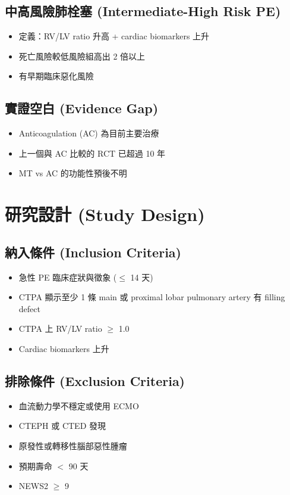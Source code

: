 \documentclass[11pt,a4paper]{article}
\begin{document}
\subsection{中高風險肺栓塞 (Intermediate-High Risk PE)}
\begin{itemize}[leftmargin=*,itemsep=2pt]
    \item 定義：RV/LV ratio 升高 + cardiac biomarkers 上升
    \item 死亡風險較低風險組高出 2 倍以上
    \item 有早期臨床惡化風險
\end{itemize}

\subsection{實證空白 (Evidence Gap)}
\begin{itemize}[leftmargin=*,itemsep=2pt]
    \item Anticoagulation (AC) 為目前主要治療
    \item 上一個與 AC 比較的 RCT 已超過 10 年
    \item MT vs AC 的功能性預後不明
\end{itemize}


\section{研究設計 (Study Design)}

\subsection{納入條件 (Inclusion Criteria)}
\begin{itemize}[leftmargin=*,itemsep=2pt]
    \item 急性 PE 臨床症狀與徵象 ($\leq$ 14 天)
    \item CTPA 顯示至少 1 條 main 或 proximal lobar pulmonary artery 有 filling defect
    \item CTPA 上 RV/LV ratio $\geq$ 1.0
    \item Cardiac biomarkers 上升
\end{itemize}

\subsection{排除條件 (Exclusion Criteria)}
\begin{itemize}[leftmargin=*,itemsep=2pt]
    \item 血流動力學不穩定或使用 ECMO
    \item CTEPH 或 CTED 發現
    \item 原發性或轉移性腦部惡性腫瘤
    \item 預期壽命 $<$ 90 天
    \item NEWS2 $\geq$ 9
\end{itemize}
\end{document}
